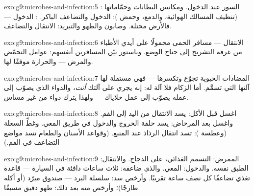 \begin{solution}{exo:g9:microbes-and-infection:5}
: السور عند الدخول. ومكانس البطانات وحمّاماتها
(تنظيف المسالك الهوائية، والدمع، وحمض ): الدخول
والتضاعف الباكر. : الدخول --- فالأرض
محتلة. وصابون  والطهو والتبريد: الانتقال
والتضاعف.
\end{solution}

\begin{solution}{exo:g9:microbes-and-infection:6}
الانتقال --- مسافر الحمى محمولًا على أيدي الأطباء من
غرفة التشريح إلى جناح الوضع. وباستور بيّن المسافرين
أنفسهم:  عوامل التحمّض والمرض  ---
والحرارة موقفًا لها.
\end{solution}

\begin{solution}{exo:g9:microbes-and-infection:7}
المضادات الحيوية تجوّع  وتكسرها --- فهي 
مستقلة لها آلتها التي تسمَّم. أما  الزكام فلا آلة
له: إنه يجري على آلتك \emph{أنت}، والدواء الذي يصوّب إلى
عمله يصوّب إلى عمل خلاياك --- ولهذا يترك دواء 
 من غير مساس.
\end{solution}

\begin{solution}{exo:g9:microbes-and-infection:8}
اغسل قبل الأكل: يسد الانتقال من اليد إلى الفم. واغسل بعد
المرحاض: يسد حلقة الخروج والدخول في طريق المعي. وغطِّ
السعلة (وعطسة ): تسد انتقال الرذاذ عند المنبع.
(وقواعد الأسنان والطعام تسد مواضع التضاعف في الفم.)
\end{solution}

\begin{solution}{exo:g9:microbes-and-infection:9}
الممرض:  التسمم الغذائي، على الدجاج. والانتقال:
الطبق نفسه. والدخول: المعي. والذي ضاعفه: ثلاث ساعات
دافئة في السيارة --- قاعدة  تغذي تضاعفًا كل نصف
ساعة تقريبًا. وأرخص سد: سلسلة البرد --- صندوق مبرّد (أو
أكله طازجًا)؛ وأرخص منه بعد ذلك: طهو دقيق مسبقًا.
\end{solution}

